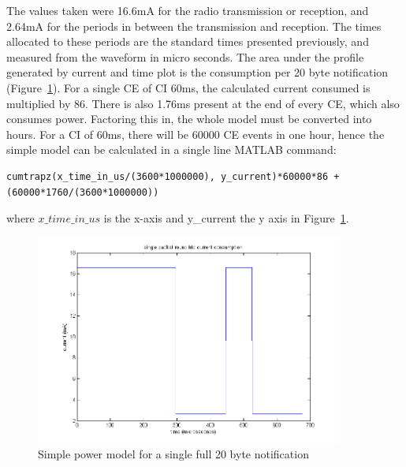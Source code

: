 \documentclass[]{article}
\begin{document}
The values taken were 16.6mA for the radio transmission or reception, and 2.64mA for the periods in between the transmission and reception. The times allocated to these periods are the standard times presented previously, and measured from the waveform in micro seconds. The area under the profile generated by current and time plot is the consumption per 20 byte notification (Figure~\ref{fig:model}). For a single \ac{CE} of \ac{CI} 60ms, the calculated current consumed is multiplied by 86. There is also 1.76ms present at the end of every \ac{CE}, which also consumes power. Factoring this in, the whole model must be converted into hours. For a \ac{CI} of 60ms, there will be 60000 \ac{CE} events in one hour, hence the simple model can be calculated in a single line MATLAB command:

\begin{lstlisting}
cumtrapz(x_time_in_us/(3600*1000000), y_current)*60000*86 + (60000*1760/(3600*1000000))
\end{lstlisting}

where $x\_time\_in\_us$ is the x-axis and y\_current the y axis in Figure~\ref{fig:model}.


\begin{figure}[H]
	\begin{center}
		\includegraphics[width = 0.9\textwidth]{model}
	\end{center}
	\caption{Simple power model for a single full 20 byte notification}
	\label{fig:model}
\end{figure}
\end{document}
